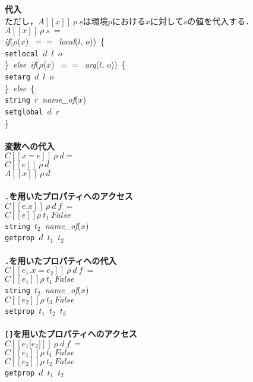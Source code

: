 \documentclass[a4j,12pt]{jarticle}
\begin{document}
{\begin{tabbing}
\textbf{代入} \\
  ただし，$A[[x]]\ \rho\ s$は環境$\rho$における$x$に対して$s$の値を代入する． \\
\>$A[[x]]\ \rho\ s\ =$\\
\>\>\textit{if}($\rho$($x$)\ $==$\ \textit{local}($l$, $o$))\ \{ \\
\>\>\>\texttt{setlocal}\ $d$\ $l$\ $o$ \\
\>\>\}\ \textit{else\ if}($\rho$($x$)\ $==$\ \textit{arg}($l$, $o$))\ \{ \\
\>\>\>\texttt{setarg}\ $d$\ $l$\ $o$ \\
\>\>\}\ \textit{else}\ \{ \\
\>\>\>\texttt{string}\ $r$\ \textit{name\_of}($x$) \\
\>\>\>\texttt{setglobal}\ $d$\ $r$ \\
\>\>\} \\
\\

\textbf{変数への代入} \\
\>$C[[x\ \texttt{=}\ e]]\ \rho\ d =$ \\
\>\>$C[[e]]\ \rho\ d$ \\
\>\>$A[[x]]\ \rho\ d$ \\
\\

\textbf{\texttt{.}を用いたプロパティへのアクセス} \\
\>$C[[e\texttt{.}x]]\ \rho\ d\ f\ =$ \\
\>\>$C[[e]] \rho\ t_1\ False$ \\
\>\>\texttt{string}\ $t_2$\ \textit{name\_of}($x$) \\
\>\>\texttt{getprop}\ $d$\ $t_1$\ $t_2$ \\
\\

\textbf{\texttt{.}を用いたプロパティへの代入} \\
\>$C[[e_1\texttt{.}x\ \texttt{=}\ e_2]]\ \rho\ d\ f\ =$ \\
\>\>$C[[e_1]] \rho\ t_1\ False$ \\
\>\>\texttt{string}\ $t_2$\ \textit{name\_of}($x$) \\
\>\>$C[[e_2]] \rho\ t_3\ False$ \\
\>\>\texttt{setprop}\ $t_1$\ $t_2$\ $t_3$ \\
\\

\textbf{\texttt{[]}を用いたプロパティへのアクセス} \\
\>$C[[e_1\texttt{[}e_2\texttt{]}]]\ \rho\ d\ f\ =$ \\
\>\>$C[[e_1]] \rho\ t_1\ False$ \\
\>\>$C[[e_2]] \rho\ t_2\ False$ \\
\>\>\texttt{getprop}\ $d$\ $t_1$\ $t_2$ \\
\\


\end{tabbing}}
\end{document}
